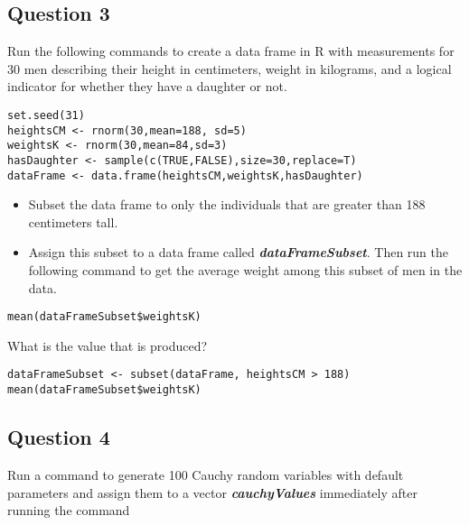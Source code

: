 \documentclass[]{article}
\begin{document}

\newpage
\subsection*{Question 3}
Run the following commands to create a data frame in R with measurements for 30 men describing their height in centimeters, weight in kilograms, and a logical indicator for whether they have a daughter or not.

\begin{framed}
\begin{verbatim}
set.seed(31)
heightsCM <- rnorm(30,mean=188, sd=5)
weightsK <- rnorm(30,mean=84,sd=3)
hasDaughter <- sample(c(TRUE,FALSE),size=30,replace=T) 
dataFrame <- data.frame(heightsCM,weightsK,hasDaughter)
\end{verbatim}
\end{framed}
\begin{itemize}
\item Subset the data frame to only the individuals that are greater than 188 centimeters tall. 

\item Assign this subset to a data frame called \textit{\textbf{dataFrameSubset}}. 
Then run the following command to get the average weight among this subset of men in the data. 
\end{itemize}
\begin{framed}
\begin{verbatim}
mean(dataFrameSubset$weightsK)
\end{verbatim}
\end{framed} 
What is the value that is produced?

\begin{framed}
\begin{verbatim}
dataFrameSubset <- subset(dataFrame, heightsCM > 188)
mean(dataFrameSubset$weightsK)
\end{verbatim}
\end{framed}
\newpage
\subsection*{Question 4}


Run a command to generate 100 Cauchy random variables with default parameters and assign them to a vector \textit{\textbf{cauchyValues}} immediately after running the command
\end{document}
